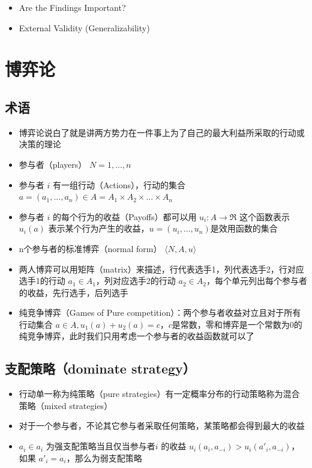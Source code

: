 \documentclass[]{book}
\providecommand{\tightlist}{%
  \setlength{\itemsep}{0pt}\setlength{\parskip}{0pt}}
\begin{document}
\begin{itemize}
\tightlist
\item
  Are the Findings Important?
\item
  External Validity (Generalizability)
\end{itemize}

\chapter{博弈论}

\hypertarget{-1}{%
\section{术语}\label{-1}}

\begin{itemize}
\tightlist
\item
  博弈论说白了就是讲两方势力在一件事上为了自己的最大利益所采取的行动或决策的理论
\item
  参与者（players） \(N= {1,...,n}\)
\item
  参与者 \(i\) 有一组行动（Actions），行动的集合 \(a=(a_1,...,a_n) \in A=A_1 \times A_2 \times ... \times A_n\)
\item
  参与者 \(i\) 的每个行为的收益（Payoffs）都可以用 \(u_i:A \rightarrow \Re\) 这个函数表示 \(u_i(a)\) 表示某个行为产生的收益，\(u = (u_i,...,u_n)\)是效用函数的集合
\item
  n个参与者的标准博弈（normal form） \(\langle N,A,u \rangle\)
\item
  两人博弈可以用矩阵（matrix）来描述，行代表选手1，列代表选手2，行对应选手1的行动 \(a_1 \in A_1\)，列对应选手2的行动 \(a_2 \in A_2\)，每个单元列出每个参与者的收益，先行选手，后列选手
\item
  纯竞争博弈（Games of Pure competition）：两个参与者收益对立且对于所有行动集合 \(a \in A, u_1(a)+u_2(a) = c\)，\(c\)是常数，零和博弈是一个常数为0的纯竞争博弈，此时我们只用考虑一个参与者的收益函数就可以了
\end{itemize}

\hypertarget{dominate-strategy}{%
\section{支配策略（dominate strategy）}\label{dominate-strategy}}

\begin{itemize}
\tightlist
\item
  行动单一称为纯策略（pure strategies）有一定概率分布的行动策略称为混合策略（mixed strategies）
\item
  对于一个参与者，不论其它参与者采取任何策略，某策略都会得到最大的收益
\item
  \(a_i \in a_i\) 为强支配策略当且仅当参与者\(i\) 的收益 \(u_i(a_i,a_{-i}) > u_i(a'_i,a_{-i})\)，如果 \(a'_i = a_i\)，那么为弱支配策略
\end{itemize}
\end{document}
